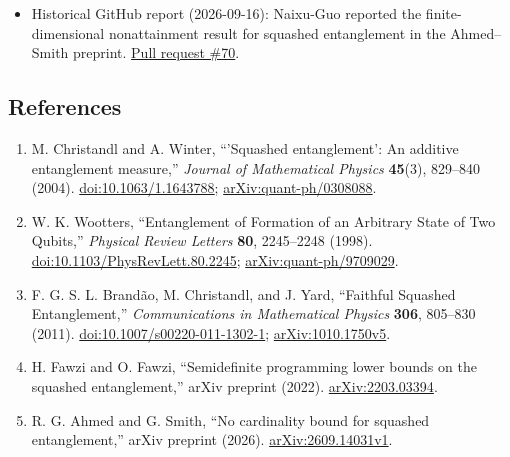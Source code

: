 \begin{itemize}
  \item Historical GitHub report (2026-09-16): Naixu-Guo reported the finite-dimensional nonattainment result for squashed entanglement in the Ahmed--Smith preprint. \href{https://github.com/Naixu-Guo/quantum-open-problems/pull/70}{Pull request \#70}.
\end{itemize}

\subsection*{References}

\begin{enumerate}[label={},leftmargin=4.8em,labelsep=0.5em]
  \footnotesize
  \item[\textup{[CW04]}]\label{ref:sqbd-christandl-winter}
  M. Christandl and A. Winter, ``'Squashed entanglement': An additive
entanglement measure,'' \emph{Journal of Mathematical Physics}
\textbf{45}(3), 829--840 (2004).
\href{https://doi.org/10.1063/1.1643788}{doi:10.1063/1.1643788};
\href{https://arxiv.org/abs/quant-ph/0308088}{arXiv:quant-ph/0308088}.

  \item[\textup{[Woo98]}]\label{ref:sqbd-wootters}
  W. K. Wootters, ``Entanglement of Formation of an Arbitrary State of Two
Qubits,'' \emph{Physical Review Letters} \textbf{80}, 2245--2248 (1998).
\href{https://doi.org/10.1103/PhysRevLett.80.2245}{doi:10.1103/PhysRevLett.80.2245};
\href{https://arxiv.org/abs/quant-ph/9709029}{arXiv:quant-ph/9709029}.

  \item[\textup{[BCY11]}]\label{ref:sqbd-brandao-christandl-yard}
  F. G. S. L. Brand\~ao, M. Christandl, and J. Yard, ``Faithful Squashed
Entanglement,'' \emph{Communications in Mathematical Physics}
\textbf{306}, 805--830 (2011).
\href{https://doi.org/10.1007/s00220-011-1302-1}{doi:10.1007/s00220-011-1302-1};
\href{https://arxiv.org/abs/1010.1750v5}{arXiv:1010.1750v5}.

  \item[\textup{[FF22]}]\label{ref:sqbd-fawzi-fawzi}
  H. Fawzi and O. Fawzi, ``Semidefinite programming lower bounds on the
squashed entanglement,'' arXiv preprint (2022).
\href{https://arxiv.org/abs/2203.03394}{arXiv:2203.03394}.

  \item[\textup{[AS26]}]\label{ref:sqbd-ahmed-smith}
  R. G. Ahmed and G. Smith, ``No cardinality bound for squashed
entanglement,'' arXiv preprint (2026).
\href{https://arxiv.org/abs/2609.14031v1}{arXiv:2609.14031v1}.
\end{enumerate}

